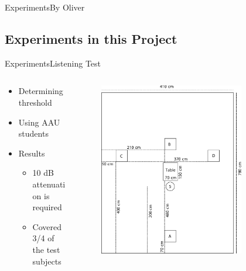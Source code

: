 \begin{frame}{Experiments}{By Oliver}
\subsection{Experiments in this Project}
\begin{frame}{Experiments}{Listening Test}		
	\begin{columns}
		\begin{column}{0.5\textwidth}
			\begin{itemize}
				\item Determining threshold
				\item Using AAU students
				\item Results
				\begin{itemize}
					\item 10 dB attenuation is required
					\item Covered 3/4 of the test subjects 
				\end{itemize}
			\end{itemize}	
		\end{column}	
		\begin{column}{0.5\textwidth} 
			\begin{figure}
					\includegraphics[width=0.8\textwidth]{figures/ListeningTestSetup.pdf}
			\end{figure}
		\end{column}
	\end{columns}
\end{frame}


\end{frame}
